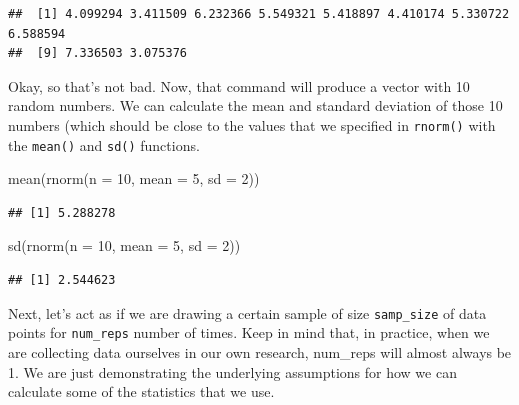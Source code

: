 \documentclass[
]{book}
\newenvironment{Shaded}{\begin{snugshade}}{\end{snugshade}}
\newcommand{\AttributeTok}[1]{\textcolor[rgb]{0.77,0.63,0.00}{#1}}
\newcommand{\DecValTok}[1]{\textcolor[rgb]{0.00,0.00,0.81}{#1}}
\newcommand{\FunctionTok}[1]{\textcolor[rgb]{0.00,0.00,0.00}{#1}}
\newcommand{\NormalTok}[1]{#1}
\begin{document}
\begin{verbatim}
##  [1] 4.099294 3.411509 6.232366 5.549321 5.418897 4.410174 5.330722 6.588594
##  [9] 7.336503 3.075376
\end{verbatim}

Okay, so that's not bad. Now, that command will produce a vector with 10 random numbers. We can calculate the mean and standard deviation of those 10 numbers (which should be close to the values that we specified in \texttt{rnorm()} with the \texttt{mean()} and \texttt{sd()} functions.

\begin{Shaded}
\begin{Highlighting}[]
\FunctionTok{mean}\NormalTok{(}\FunctionTok{rnorm}\NormalTok{(}\AttributeTok{n =} \DecValTok{10}\NormalTok{, }\AttributeTok{mean =} \DecValTok{5}\NormalTok{, }\AttributeTok{sd =} \DecValTok{2}\NormalTok{))}
\end{Highlighting}
\end{Shaded}

\begin{verbatim}
## [1] 5.288278
\end{verbatim}

\begin{Shaded}
\begin{Highlighting}[]
\FunctionTok{sd}\NormalTok{(}\FunctionTok{rnorm}\NormalTok{(}\AttributeTok{n =} \DecValTok{10}\NormalTok{, }\AttributeTok{mean =} \DecValTok{5}\NormalTok{, }\AttributeTok{sd =} \DecValTok{2}\NormalTok{))}
\end{Highlighting}
\end{Shaded}

\begin{verbatim}
## [1] 2.544623
\end{verbatim}

Next, let's act as if we are drawing a certain sample of size \texttt{samp\_size} of data points for \texttt{num\_reps} number of times. Keep in mind that, in practice, when we are collecting data ourselves in our own research, num\_reps will almost always be 1. We are just demonstrating the underlying assumptions for how we can calculate some of the statistics that we use.
\end{document}
